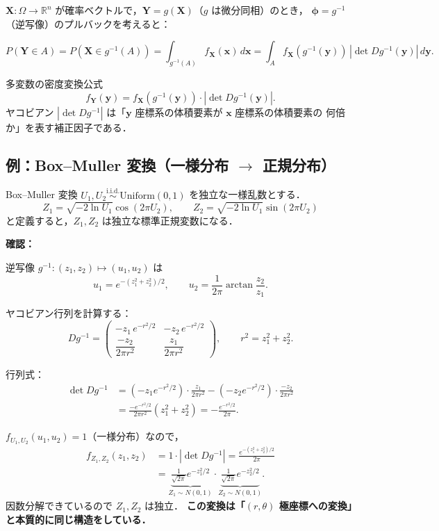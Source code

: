 \documentclass[lualatex,ja=standard,a4paper,12pt]{bxjsarticle}
\begin{document}
$\mathbf{X}: \Omega \to \mathbb{R}^n$ が確率ベクトルで，$\mathbf{Y} = g(\mathbf{X})$（$g$ は微分同相）のとき，
$\boldsymbol{\phi} = g^{-1}$（逆写像）のプルバックを考えると：

\[
  P(\mathbf{Y} \in A)
  = P(\mathbf{X} \in g^{-1}(A))
  = \int_{g^{-1}(A)} f_{\mathbf{X}}(\mathbf{x})\,d\mathbf{x}
  = \int_A f_{\mathbf{X}}(g^{-1}(\mathbf{y}))\,|\det D g^{-1}(\mathbf{y})|\,d\mathbf{y}.
\]

\begin{thmbox}{多変数の密度変換公式}
\[
  f_{\mathbf{Y}}(\mathbf{y}) = f_{\mathbf{X}}(g^{-1}(\mathbf{y})) \cdot |\det D g^{-1}(\mathbf{y})|.
\]
ヤコビアン $|\det D g^{-1}|$ は「$\mathbf{y}$ 座標系の体積要素が $\mathbf{x}$ 座標系の体積要素の
何倍か」を表す補正因子である．
\end{thmbox}

\subsection{例：Box--Muller 変換（一様分布 $\to$ 正規分布）}

\begin{exbox}{Box--Muller 変換}
$U_1, U_2 \overset{\mathrm{i.i.d.}}{\sim} \mathrm{Uniform}(0,1)$ を独立な一様乱数とする．
\[
  Z_1 = \sqrt{-2\ln U_1}\cos(2\pi U_2), \qquad
  Z_2 = \sqrt{-2\ln U_1}\sin(2\pi U_2)
\]
と定義すると，$Z_1, Z_2$ は独立な標準正規変数になる．

\medskip
\noindent\textbf{確認：}

逆写像 $g^{-1}: (z_1, z_2) \mapsto (u_1, u_2)$ は
\[
  u_1 = e^{-(z_1^2+z_2^2)/2}, \qquad u_2 = \frac{1}{2\pi}\arctan\frac{z_2}{z_1}.
\]

ヤコビアン行列を計算する：
\[
  D g^{-1} =
  \begin{pmatrix}
    -z_1\,e^{-r^2/2} & -z_2\,e^{-r^2/2} \\[4pt]
    \dfrac{-z_2}{2\pi r^2} & \dfrac{z_1}{2\pi r^2}
  \end{pmatrix},
  \qquad r^2 = z_1^2 + z_2^2.
\]

行列式：
\begin{align*}
  \det D g^{-1}
  &= (-z_1 e^{-r^2/2})\cdot\frac{z_1}{2\pi r^2}
   - (-z_2 e^{-r^2/2})\cdot\frac{-z_2}{2\pi r^2} \\
  &= \frac{-e^{-r^2/2}}{2\pi r^2}(z_1^2 + z_2^2)
   = -\frac{e^{-r^2/2}}{2\pi}.
\end{align*}

$f_{U_1,U_2}(u_1,u_2) = 1$（一様分布）なので，
\begin{align*}
  f_{Z_1,Z_2}(z_1,z_2)
  &= 1 \cdot \left|\det D g^{-1}\right|
   = \frac{e^{-(z_1^2+z_2^2)/2}}{2\pi} \\
  &= \underbrace{\frac{1}{\sqrt{2\pi}}e^{-z_1^2/2}}_{Z_1 \sim N(0,1)}
     \cdot
     \underbrace{\frac{1}{\sqrt{2\pi}}e^{-z_2^2/2}}_{Z_2 \sim N(0,1)}.
\end{align*}
因数分解できているので $Z_1, Z_2$ は独立．
\noindent\textbf{この変換は「$(r, \theta)$ 極座標への変換」と本質的に同じ構造をしている．}
\end{exbox}
\end{document}
